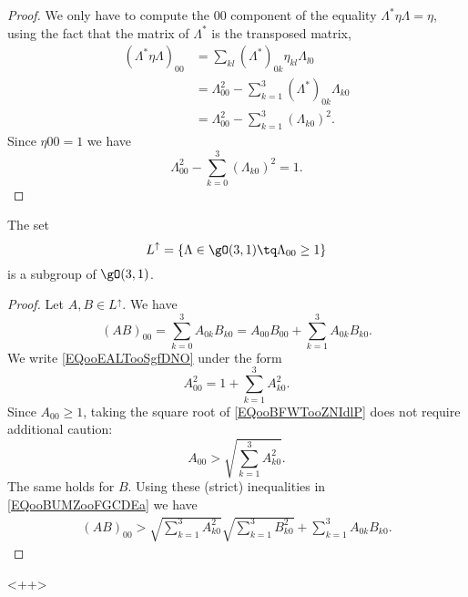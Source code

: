 \begin{proof}
    We only have to compute the \( 00\) component of the equality \( \Lambda^*\eta\Lambda=\eta\), using the fact that the matrix of \( \Lambda^*\) is the transposed matrix,
    \begin{subequations}
        \begin{align}
            (\Lambda^*\eta\Lambda)_{00}&=\sum_{kl}(\Lambda^*)_{0k}\eta_{kl}\Lambda_{l0}\\
            &=\Lambda_{00}^2-\sum_{k=1}^3(\Lambda^*)_{0k}\Lambda_{k0}\\
            &=\Lambda_{00}^2-\sum_{k=1}^3(\Lambda_{k0})^2.
        \end{align}
    \end{subequations}
    Since \( \eta{00}=1\) we have
    \begin{equation}        \label{EQooEALTooSgfDNO}
        \Lambda_{00}^2-\sum_{k=0}^3(\Lambda_{k0})^2=1.
    \end{equation}
\end{proof}

\begin{lemma}
    The set
    \begin{equation}
        L^{\uparrow}=\{ \Lambda\in\gO(3,1)\tq \Lambda_{00}\geq 1 \}
    \end{equation}
    is a subgroup of \( \gO(3,1)\).
\end{lemma}

\begin{proof}
    Let \( A,B\in L^{\uparrow}\). We have
    \begin{equation}        \label{EQooBUMZooFGCDEa}
        (AB)_{00}=\sum_{k=0}^3A_{0k}B_{k0}=A_{00}B_{00}+\sum_{k=1}^3A_{0k}B_{k0}.
    \end{equation}
    We write \eqref{EQooEALTooSgfDNO} under the form
    \begin{equation}        \label{EQooBFWTooZNIdlP}
        A_{00}^2=1+\sum_{k=1}^3A_{k0}^2.
    \end{equation}
    Since \( A_{00}\geq 1\), taking the square root of \eqref{EQooBFWTooZNIdlP} does not require additional caution:
    \begin{equation}
        A_{00}>\sqrt{ \sum_{k=1}^3A_{k0}^2 }.
    \end{equation}
    The same holds for \( B\). Using these (strict) inequalities in \eqref{EQooBUMZooFGCDEa} we have
    \begin{subequations}
        \begin{align}
            (AB)_{00}>\sqrt{ \sum_{k=1}^3A_{k0}^2 }\sqrt{ \sum_{k=1}^3B_{k0}^2 }+\sum_{k=1}^3A_{0k}B_{k0}.
        \end{align}
    \end{subequations}
\end{proof}
<++>

